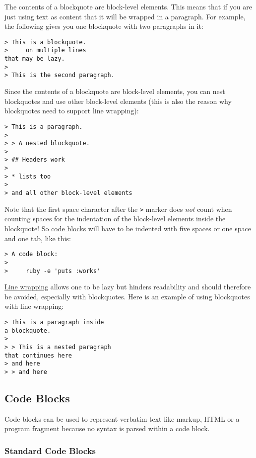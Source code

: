 \documentclass[a4paper]{article}
\begin{document}
The contents of a blockquote are block-level elements. This means that
if you are just using text as content that it will be wrapped in a
paragraph. For example, the following gives you one blockquote with two
paragraphs in it:

\begin{verbatim}
> This is a blockquote.
>     on multiple lines
that may be lazy.
>
> This is the second paragraph.
\end{verbatim}

Since the contents of a blockquote are block-level elements, you can
nest blockquotes and use other block-level elements (this is also the
reason why blockquotes need to support line wrapping):

\begin{verbatim}
> This is a paragraph.
>
> > A nested blockquote.
>
> ## Headers work
>
> * lists too
>
> and all other block-level elements
\end{verbatim}

Note that the first space character after the \texttt{\textgreater{}}
marker does \emph{not} count when counting spaces for the indentation of
the block-level elements inside the blockquote! So
\protect\hyperlink{code-blocks}{code blocks} will have to be indented
with five spaces or one space and one tab, like this:

\begin{verbatim}
> A code block:
>
>     ruby -e 'puts :works'
\end{verbatim}

\protect\hyperlink{line-wrapping}{Line wrapping} allows one to be lazy
but hinders readability and should therefore be avoided, especially with
blockquotes. Here is an example of using blockquotes with line wrapping:

\begin{verbatim}
> This is a paragraph inside
a blockquote.
>
> > This is a nested paragraph
that continues here
> and here
> > and here
\end{verbatim}

\hypertarget{code-blocks}{\subsection{Code Blocks}\label{code-blocks}}

Code blocks can be used to represent verbatim text like markup, HTML or
a program fragment because no syntax is parsed within a code block.

\hypertarget{standard-code-blocks}{\subsubsection{Standard Code
Blocks}\label{standard-code-blocks}}
\end{document}
